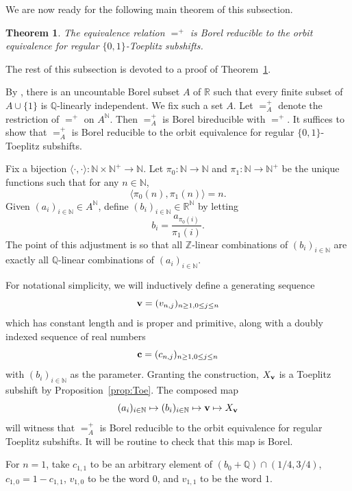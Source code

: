 \documentclass{amsart}
\newtheorem{theorem}{Theorem}[section]
\theoremstyle{definition}
\theoremstyle{problem}
\theoremstyle{remark}
\numberwithin{equation}{section}
\begin{document}
We are now ready for the following main theorem of this subsection.

\begin{theorem} \label{thm:Toe} The equivalence relation $=^+$ is Borel reducible to the orbit equivalence for regular $\{0,1\}$-Toeplitz subshifts.
\end{theorem}

The rest of this subsection is devoted to a proof of Theorem~\ref{thm:Toe}.

By \cite[Lemma 4.5]{Kaya}, there is an uncountable Borel subset $A$ of $\mathbb{R}$ such that every finite subset of $A\cup\{1\}$ is $\mathbb{Q}$-linearly independent. We fix such a set $A$. Let $=^+_A$ denote the restriction of $=^+$ on $A^\mathbb{N}$. Then $=^+_A$ is Borel bireducible with $=^+$. It suffices to show that $=^+_A$ is Borel reducible to the orbit equivalence for regular $\{0,1\}$-Toeplitz subshifts.

Fix a bijection $\langle \cdot, \cdot\rangle\colon \mathbb{N}\times\mathbb{N}^+\to\mathbb{N}$. Let $\pi_0\colon \mathbb{N}\to \mathbb{N}$ and $\pi_1\colon \mathbb{N}\to \mathbb{N}^+$ be the unique functions such that for any $n\in\mathbb{N}$, 
$$ \langle \pi_0(n), \pi_1(n)\rangle=n. $$
Given $(a_i)_{i\in\mathbb{N}}\in A^\mathbb{N}$, define $(b_i)_{i\in\mathbb{N}}\in \mathbb{R}^\mathbb{N}$ by letting
$$ b_i=\displaystyle\frac{a_{\pi_0(i)}}{\pi_1(i)}.$$  %
The point of this adjustment is so that all $\mathbb{Z}$-linear combinations of $(b_i)_{i\in\mathbb{N}}$ are exactly all $\mathbb{Q}$-linear combinations of $(a_i)_{i\in\mathbb{N}}$.

For notational simplicity, we will inductively define a generating sequence 
$$ {\bf v}=(v_{n,j})_{n\geq 1, 0\leq j\leq n} $$
which has constant length and is proper and primitive, 
along with a doubly indexed sequence of real numbers
$$ {\bf c}=(c_{n,j})_{n\geq 1, 0\leq j\leq n} $$
with $(b_i)_{i\in\mathbb{N}}$ as the parameter. Granting the construction, $X_{\bf v}$ is a Toeplitz subshift by Proposition~\ref{prop:Toe}. The composed map
$$ (a_i)_{i\in\mathbb{N}}\mapsto (b_i)_{i\in\mathbb{N}}\mapsto {\bf v}\mapsto X_{\bf v} $$
will witness that $=^+_A$ is Borel reducible to the orbit equivalence for regular Toeplitz subshifts. It will be routine to check that this map is Borel. 

For $n=1$, take $c_{1,1}$ to be an arbitrary element of $(b_0+\mathbb{Q})\cap(1/4,3/4)$, $c_{1,0}=1-c_{1,1}$, $v_{1,0}$ to be the word $0$, and $v_{1,1}$ to be the word $1$. 
\end{document}
